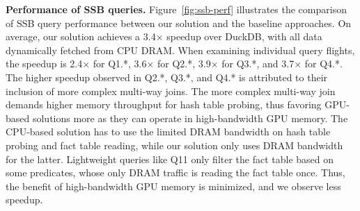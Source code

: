 \begin{comment}
Unlike sort, hash join is still an IO-bound kernel even with our IO-redistribution technique.
As shown in Figure~\ref{fig:hash-join-perf}(a), our solution achieves 2.3 billion tuples per second throughput.
This is around 24.1$\times$ over DuckDB, 2.4$\times$ over the CPU implementation of Triton Join, 1.3$\times$ over the CPU-GPU-NVlink based GPU Triton Join~\cite{triton-join}, and 3.2$\times$ over the single GPU solution with a common PCIe link.
The speedup over the single GPU IO solution is more significant because all hash join phases are IO-bound.
This can be observed from Figure~\ref{fig:hash-join-perf}(c).
The \texttt{HashJoinExOp} takes only ~34ms to finish the on-GPU join kernel, which is much lower than the ~61ms data transfer time.
Similarly, it only takes ~90ms to partition a chunk of data transferred in ~113ms.
All phases scale uniformly with the improvement of IO throughput, thus the time breakdown in Figure~\ref{fig:hash-join-perf}(b) shows that they take a similar amount of time.
While achieving better results than Triton Join, we do not use any proprietary CPU-GPU links to improve the IO through, but solely based on commodity PCIe links.
\end{comment}

\noindent
\textbf{Performance of SSB queries.}
Figure~\ref{fig:ssb-perf} illustrates the comparison of SSB query performance between our solution and the baseline approaches.
On average, our solution achieves a 3.4$\times$ speedup over DuckDB, with all data dynamically fetched from CPU DRAM.
When examining individual query flights, the speedup is 2.4$\times$ for Q1.*, 3.6$\times$ for Q2.*, 3.9$\times$ for Q3.*, and 3.7$\times$ for Q4.*. 
The higher speedup observed in Q2.*, Q3.*, and Q4.* is attributed to their inclusion of more complex multi-way joins.
The more complex multi-way join demands higher memory throughput for hash table probing, thus favoring GPU-based solutions more as they can operate in high-bandwidth GPU memory.
The CPU-based solution has to use the limited DRAM bandwidth on hash table probing and fact table reading, while our solution only uses DRAM bandwidth for the latter.
Lightweight queries like Q11 only filter the fact table based on some predicates, whose only DRAM traffic is reading the fact table once.
Thus, the benefit of high-bandwidth GPU memory is minimized, and we observe less speedup. 


